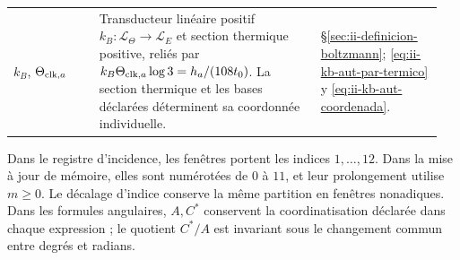 \begin{longtable}{@{}>{\raggedright\arraybackslash}p{0.19\linewidth}
                    >{\raggedright\arraybackslash}p{0.49\linewidth}
                    >{\raggedright\arraybackslash}p{0.27\linewidth}@{}}
\(k_B\), \(\Theta_{{\rm clk},a}\)
& Transducteur linéaire positif
  \(k_B:\mathcal L_\Theta\to\mathcal L_E\) et section thermique
  positive, reliés par
  \(k_B\Theta_{{\rm clk},a}\log3=h_a/(108t_0)\).
  La section thermique et les bases déclarées déterminent sa
  coordonnée individuelle.
& \S\ref{sec:ii-definicion-boltzmann};
  \eqref{eq:ii-kb-aut-par-termico} y
  \eqref{eq:ii-kb-aut-coordenada}.\\

\end{longtable}
\endgroup

Dans le registre d’incidence, les fenêtres portent les indices \(1,\ldots,12\).
Dans la mise à jour de mémoire, elles sont numérotées de \(0\) à \(11\), et
leur prolongement utilise \(m\geq0\). Le décalage d’indice conserve
la même partition en fenêtres nonadiques. Dans les formules angulaires,
\(A,C^*\) conservent la coordinatisation déclarée dans chaque expression ; le quotient
\(C^*/A\) est invariant sous le changement commun entre degrés et radians.
